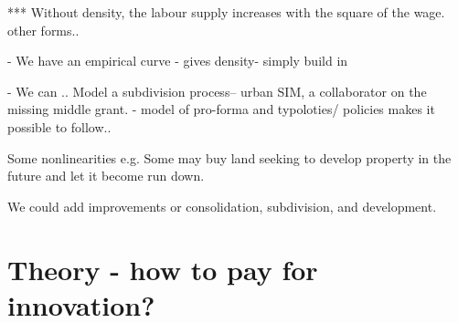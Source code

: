 *** Without density, the labour supply increases with the square of the wage.  other forms..

- We have an empirical curve - gives density- simply build in

- We can .. Model a subdivision process-- urban SIM, a collaborator on the missing middle grant. - model of pro-forma and typoloties/ policies makes it possible to follow..

Some nonlinearities e.g. Some may buy land seeking to develop property in the future and let it become run down. 

We could add improvements
 or consolidation, subdivision, and development. 


\section{Theory - how to pay for innovation?}

